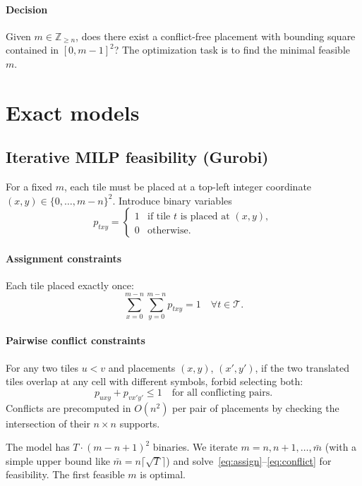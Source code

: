 \documentclass[11pt]{article}
\newcommand{\bbZ}{\mathbb{Z}}
\begin{document}
\paragraph{Decision} Given $m\in\bbZ_{\ge n}$, does there exist a conflict-free placement with bounding square contained in $[0,m-1]^2$? The optimization task is to find the minimal feasible $m$.

\section{Exact models}
\subsection{Iterative MILP feasibility (Gurobi)}
For a fixed $m$, each tile must be placed at a top-left integer coordinate $(x,y)\in\{0,\dots,m-n\}^2$. Introduce binary variables
\[
 p_{txy} = \begin{cases}1 & \text{if tile $t$ is placed at $(x,y)$},\\ 0 & \text{otherwise.}\end{cases}
\]
\paragraph{Assignment constraints} Each tile placed exactly once:
\begin{equation}
\sum_{x=0}^{m-n}\sum_{y=0}^{m-n} p_{txy} = 1\quad \forall t\in\mathcal{T}. \label{eq:assign}
\end{equation}
\paragraph{Pairwise conflict constraints} For any two tiles $u<v$ and placements $(x,y)$, $(x',y')$, if the two translated tiles overlap at any cell with different symbols, forbid selecting both:
\begin{equation}
 p_{uxy} + p_{vx'y'} \le 1 \quad \text{for all conflicting pairs.} \label{eq:conflict}
\end{equation}
Conflicts are precomputed in $O(n^2)$ per pair of placements by checking the intersection of their $n\times n$ supports.

The model has $T\cdot(m-n+1)^2$ binaries. We iterate $m=n,n+1,\ldots,\bar m$ (with a simple upper bound like $\bar m = n\lceil\sqrt{T}\rceil$) and solve~\eqref{eq:assign}--\eqref{eq:conflict} for feasibility. The first feasible $m$ is optimal.
\end{document}
